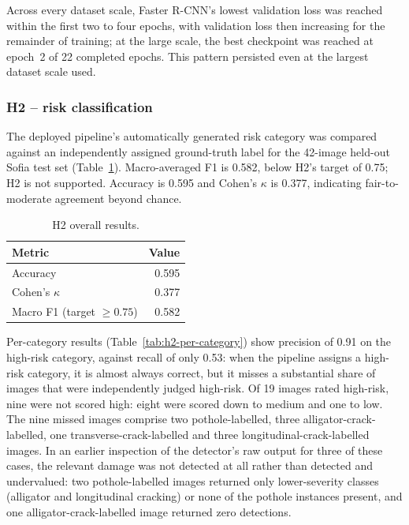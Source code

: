 \documentclass[10pt,a4paper,twocolumn]{article}
\begin{document}
Across every dataset scale, Faster R-CNN's lowest validation loss was
reached within the first two to four epochs, with validation loss then
increasing for the remainder of training; at the large scale, the best
checkpoint was reached at epoch~2 of 22 completed epochs. This pattern
persisted even at the largest dataset scale used.

\subsubsection{H2 -- risk classification}
\label{sec:res-h2}

The deployed pipeline's automatically generated risk category was
compared against an independently assigned ground-truth label for the
42-image held-out Sofia test set (Table~\ref{tab:h2-results}). Macro-averaged
F1 is 0.582, below H2's target of 0.75; H2 is not supported. Accuracy is
0.595 and Cohen's $\kappa$ is 0.377, indicating fair-to-moderate agreement
beyond chance.

\begin{table}[t]
  \centering
  \small
  \caption{H2 overall results.}
  \label{tab:h2-results}
  \begin{tabular}{@{}lr@{}}
    \toprule
    Metric & Value \\
    \midrule
    Accuracy & 0.595 \\
    Cohen's $\kappa$ & 0.377 \\
    Macro F1 (target $\geq 0.75$) & 0.582 \\
    \bottomrule
  \end{tabular}
\end{table}

Per-category results (Table~\ref{tab:h2-per-category}) show precision of
0.91 on the high-risk category, against recall of only 0.53: when the
pipeline assigns a high-risk category, it is almost always correct, but
it misses a substantial share of images that were independently judged
high-risk. Of 19 images rated high-risk, nine were not scored high: eight were
scored down to medium and one to low. The nine missed images comprise two
pothole-labelled, three alligator-crack-labelled, one transverse-crack-labelled
and three longitudinal-crack-labelled images. In an earlier inspection of the
detector's raw output for three of these cases, the relevant damage was not
detected at all rather than detected and undervalued: two pothole-labelled
images returned only lower-severity classes (alligator and longitudinal cracking) or none of
the pothole instances present, and one alligator-crack-labelled image
returned zero detections.
\end{document}
